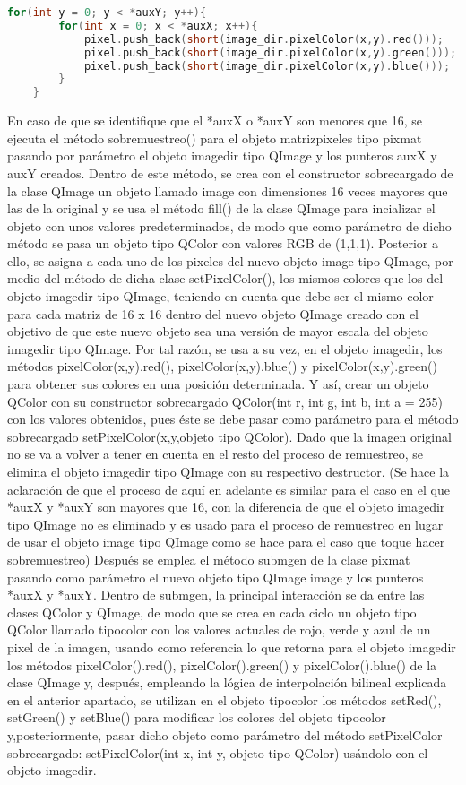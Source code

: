 \documentclass{article}
\begin{document}
\begin{lstlisting}[language=C++, label = assigntopix]
    for(int y = 0; y < *auxY; y++){
        for(int x = 0; x < *auxX; x++){
            pixel.push_back(short(image_dir.pixelColor(x,y).red()));
            pixel.push_back(short(image_dir.pixelColor(x,y).green()));
            pixel.push_back(short(image_dir.pixelColor(x,y).blue()));
        }
    }
\end{lstlisting}
En caso de que se identifique que el *auxX o *auxY son menores que 16, se ejecuta el método sobremuestreo() para el objeto matrizpixeles tipo pixmat pasando por parámetro el objeto imagedir tipo QImage y los punteros auxX y auxY creados. Dentro de este método, se crea con el constructor sobrecargado de la clase QImage un objeto llamado image con dimensiones 16 veces mayores que las de la original y se usa el método fill() de la clase QImage para incializar el objeto con unos valores predeterminados, de modo que como parámetro de dicho método se pasa un objeto tipo QColor con valores RGB de (1,1,1). Posterior a ello, se asigna a cada uno de los pixeles del nuevo objeto image tipo QImage, por medio del método de dicha clase setPixelColor(), los mismos colores que los del objeto imagedir tipo QImage, teniendo en cuenta que debe ser el mismo color para cada matriz de 16 x 16 dentro del nuevo objeto QImage creado con el objetivo de que este nuevo objeto sea una versión de mayor escala del objeto imagedir tipo QImage. Por tal razón, se usa a su vez, en el objeto imagedir, los métodos pixelColor(x,y).red(), pixelColor(x,y).blue() y pixelColor(x,y).green() para obtener sus colores en una posición determinada. Y así, crear un objeto QColor con su constructor sobrecargado QColor(int r, int g, int b, int a = 255) con los valores obtenidos, pues éste se debe pasar como parámetro para el método sobrecargado setPixelColor(x,y,objeto tipo QColor). Dado que la imagen original no se va a volver a tener en cuenta en el resto del proceso de remuestreo, se elimina el objeto imagedir tipo QImage con su respectivo destructor.
(Se hace la aclaración de que el proceso de aquí en adelante es similar para el caso en el que *auxX y *auxY son mayores que 16, con la diferencia de que el objeto imagedir tipo QImage no es eliminado y es usado para el proceso de remuestreo en lugar de usar el objeto image tipo QImage como se hace para el caso que toque hacer sobremuestreo)
Después se emplea el método submgen de la clase pixmat pasando como parámetro el nuevo objeto tipo QImage image y los punteros *auxX y *auxY. Dentro de submgen, la principal interacción se da entre las clases QColor y QImage, de modo que se crea en cada ciclo un objeto tipo QColor llamado tipocolor con los valores actuales de rojo, verde y azul de un pixel de la imagen, usando como referencia lo que retorna para el objeto imagedir los métodos pixelColor().red(), pixelColor().green() y pixelColor().blue() de la clase QImage y, después, empleando la lógica de interpolación bilineal explicada en el anterior apartado, se utilizan en el objeto tipocolor los métodos setRed(), setGreen() y setBlue() para modificar los colores del objeto tipocolor y,posteriormente, pasar dicho objeto como parámetro del método setPixelColor sobrecargado: setPixelColor(int x, int y, objeto tipo QColor) usándolo con el objeto imagedir.
\end{document}
